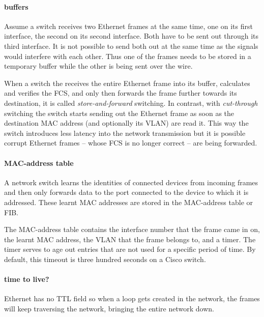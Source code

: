 \paragraph{buffers}
Assume a switch receives two Ethernet frames at the same time, one on its first interface, the second on its second interface.
Both have to be sent out through its third interface.
It is not possible to send both out at the same time as the signals would interfere with each other.
Thus one of the frames needs to be stored in a temporary buffer while the other is being sent over the wire.


When a switch the receives the entire Ethernet frame into its buffer, calculates and verifies the \acs{FCS}, and only then forwards the frame further towards its destination, it is called \emph{store-and-forward} switching.
In contrast, with \emph{cut-through} switching the switch starts sending out the Ethernet frame as soon as the destination \acs{MAC} address (and optionally its \acs{VLAN}) are read it.
This way the switch introduces less latency into the network transmission but it is possible corrupt Ethernet frames -- whose \acs{FCS} is no longer correct -- are being forwarded.

\paragraph{\acs{MAC}-address table}
A network switch learns the identities of connected devices from incoming frames and then only forwards data to the port connected to the device to which it is addressed.
These learnt \acs{MAC} addresses are stored in the \ac{MAC}-address table or \acf{FIB}.

The \acs{MAC}-address table contains the interface number that the frame came in on, the learnt \acs{MAC} address, the \acs{VLAN} that the frame belongs to, and a timer.
The timer serves to age out entries that are not used for a specific period of time.
By default, this timeout is three hundred seconds on a Cisco switch.

\paragraph{time to live?}
Ethernet has no \acl{TTL} field so when a loop gets created in the network, the frames will keep traversing the network, bringing the entire network down.

